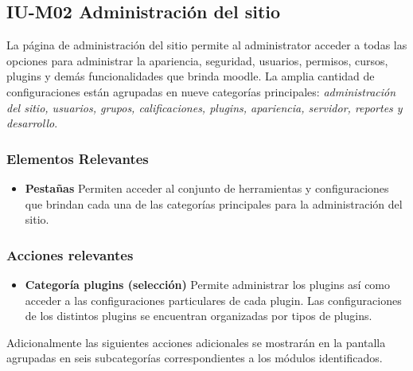 
\subsection{IU-M02 Administración del sitio}

 La página de administración del sitio permite al administrator acceder a todas las opciones para
 administrar la apariencia, seguridad, usuarios, permisos, cursos, plugins y demás funcionalidades
 que brinda moodle. La amplia cantidad de configuraciones están agrupadas en nueve categorías
 principales: {\it administración del sitio, usuarios, grupos, calificaciones, plugins, apariencia,
 servidor, reportes y desarrollo}.


\subsubsection{Elementos Relevantes}

    \begin{itemize}
    \item {\bf Pestañas}
        Permiten acceder al conjunto de herramientas y configuraciones que brindan
        cada una de las categorías principales para la administración del sitio.
    \end{itemize}

\subsubsection{Acciones relevantes}

    \begin{itemize}
    \item {\bf Categoría plugins (selección) }
        Permite administrar los plugins así como acceder a las configuraciones particulares de
        cada plugin. Las configuraciones de los distintos plugins se encuentran organizadas por
        tipos de plugins.
    \end{itemize}

 \noindent 
 Adicionalmente las siguientes acciones adicionales se mostrarán en la pantalla 
 agrupadas en seis subcategorías correspondientes a los módulos identificados.


